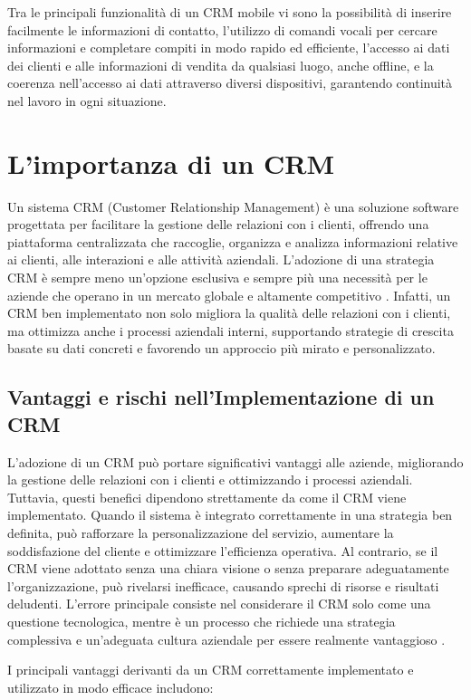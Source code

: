 \documentclass[target=bach,aauheader=,style=]{thud}
\begin{document}
\noindent Tra le principali funzionalità di un CRM mobile vi sono la possibilità di inserire facilmente le informazioni di contatto, l'utilizzo di comandi vocali per cercare informazioni e completare compiti in modo rapido ed efficiente, l'accesso ai dati dei clienti e alle informazioni di vendita da qualsiasi luogo, anche offline, e la coerenza nell'accesso ai dati attraverso diversi dispositivi, garantendo continuità nel lavoro in ogni situazione.

\section{L'importanza di un CRM}
Un sistema CRM (Customer Relationship Management) è una soluzione software progettata per facilitare la gestione delle relazioni con i clienti, offrendo una piattaforma centralizzata che raccoglie, organizza e analizza informazioni relative ai clienti, alle interazioni e alle attività aziendali. L'adozione di una strategia CRM è sempre meno un'opzione esclusiva e sempre più una necessità per le aziende che operano in un mercato globale e altamente competitivo \cite{ciatocrm}. Infatti, un CRM ben implementato non solo migliora la qualità delle relazioni con i clienti, ma ottimizza anche i processi aziendali interni, supportando strategie di crescita basate su dati concreti e favorendo un approccio più mirato e personalizzato.

\subsection{Vantaggi e rischi nell'Implementazione di un CRM}
L'adozione di un CRM può portare significativi vantaggi alle aziende, migliorando la gestione delle relazioni con i clienti e ottimizzando i processi aziendali. Tuttavia, questi benefici dipendono strettamente da come il CRM viene implementato. Quando il sistema è integrato correttamente in una strategia ben definita, può rafforzare la personalizzazione del servizio, aumentare la soddisfazione del cliente e ottimizzare l'efficienza operativa. Al contrario, se il CRM viene adottato senza una chiara visione o senza preparare adeguatamente l'organizzazione, può rivelarsi inefficace, causando sprechi di risorse e risultati deludenti. L'errore principale consiste nel considerare il CRM solo come una questione tecnologica, mentre è un processo che richiede una strategia complessiva e un'adeguata cultura aziendale per essere realmente vantaggioso \cite{ciatocrm}. 

\noindent I principali vantaggi derivanti da un CRM correttamente implementato e utilizzato in modo efficace includono:
\end{document}
